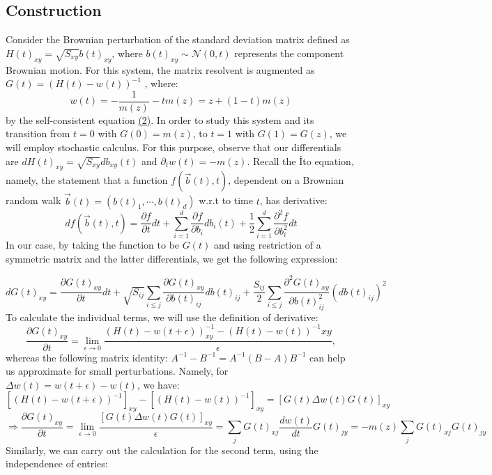 \documentclass[11pt]{article}
\begin{document}
\subsection{Construction}
\noindent Consider the Brownian perturbation of the standard deviation matrix defined as $H(t)_{xy} = \sqrt{S_{xy}}b(t)_{xy}$, where $b(t)_{xy}\sim \mathcal{N}(0, t)$ represents the component Brownian motion. For this system, the matrix resolvent is augmented as $G(t) = (H(t)-w(t))^{-1}$ , where: \begin{equation*}
w(t) = -\frac{1}{m(z)}-tm(z) = z+(1-t)m(z) \tag{3}
\end{equation*}
by the self-consistent equation \hyperref[self-consistent]{(2)}. In order to study this system and its transition from $t=0$ with $G(0) = m(z)$, to $t=1$ with $G(1)=G(z)$, we will employ stochastic calculus. For this purpose, observe that our differentials are $dH(t)_{xy} = \sqrt{S_{xy}}db_{xy}(t)$ and $\partial_tw(t) = -m(z)$. Recall the Îto equation, namely, the statement that a function $f(\vec{b}(t), t)$, dependent on a Brownian random walk  $\vec{b}(t) = (b(t)_1, \cdots, b(t)_d)$ w.r.t to time $t$, has derivative:
$$df(\vec{b}(t), t) = \frac{\partial f}{\partial t}dt + \sum_{i=1}^d \frac{\partial f}{\partial b_i}db_i(t) + \frac{1}{2}\sum_{i=1}^d \frac{\partial^2 f}{\partial b_i^2} dt$$
In our case, by taking the function to be $G(t)$ and using restriction of a symmetric matrix and the latter differentials, we get the following expression:

$$dG(t)_{xy} = \frac{\partial G(t)_{xy}}{\partial t}dt +\sqrt{S_{ij}}\sum_{i\leq j}\frac{\partial G(t)_{xy}}{\partial b(t)_{ij}}db(t)_{ij}
+\frac{S_{ij}}{2}\sum_{i\leq j}\frac{\partial^2 G(t)_{xy}}{\partial b(t)_{ij}^2}(db(t)_{ij})^2$$
To calculate the individual terms, we will use the definition of derivative:
$$\frac{\partial G(t)_{xy}}{\partial t}=\lim_{\epsilon\rightarrow 0}\frac{(H(t)-w(t+\epsilon))^{-1}_{xy}-(H(t)-w(t))^{-1}{xy}}{\epsilon},$$
whereas the following matrix identity: $A^{-1}-B^{-1} = A^{-1}(B-A)B^{-1}$ can help us approximate for small perturbations. Namely, for $\Delta w(t) = w(t+\epsilon)-w(t)$, we have:
$$\left[(H(t)-w(t+\epsilon))^{-1}\right]_{xy}-\left[(H(t)-w(t))^{-1}\right ]_{xy}= \left[ G(t)\Delta w(t) G(t)\right]_{xy}$$$$\Rightarrow \frac{\partial G(t)_{xy}}{\partial t} =\lim_{\epsilon\rightarrow 0} \frac{ \left[ G(t)\Delta w(t) G(t)\right]_{xy}}{\epsilon}=\sum_{j}G(t)_{xj}\frac{dw(t)}{dt}G(t)_{jy}= -m(z)\sum_j G(t)_{xj}G(t)_{jy}$$
Similarly, we can carry out the calculation for the second term, using the independence of entries:
\end{document}
